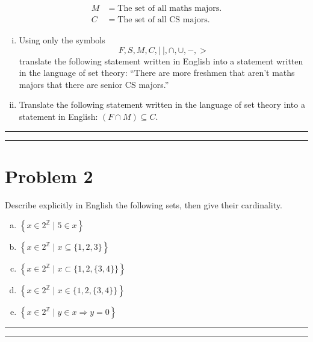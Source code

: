 \documentclass{article}
\theoremstyle{definition}
\newenvironment{solution}{\bigskip\hrule{\hfill}}{\bigskip\hrule{\hfill}} %
\begin{document}
\begin{enumerate}[a)]
\begin{align*}
        M & = \text{The set of all maths majors}. \\
        C & = \text{The set of all CS majors}. 
    \end{align*}
    \begin{enumerate}[i.] %
        \item Using only the symbols $$F,S,M,C,\left|~\right|,\cap,\cup,-,>$$ translate the following statement written in English into a statement written in the language of set theory: ``There are more freshmen that aren't maths majors that there are senior CS majors.''
        \item Translate the following statement written in the language of set theory into a statement in English: $\left(F\cap M\right)\subseteq C$.
    \end{enumerate}
\end{enumerate}
\begin{solution}


\end{solution}


\newpage


\section*{Problem 2}
Describe explicitly in English the following sets, then give their cardinality.
\begin{enumerate}[a)] %
    \item $\left\{x\in 2^{\mathbb{Z}}\mid 5\in x\right\}$
    \item $\left\{x\in 2^{\mathbb{Z}}\mid x\subseteq\{1,2,3\}\right\}$
    \item $\left\{x\in 2^{\mathbb{Z}}\mid x\subset\{1,2,\{3,4\}\}\right\}$
    \item $\left\{x\in 2^{\mathbb{Z}}\mid x\in\{1,2,\{3,4\}\}\right\}$
    \item $\left\{x\in 2^{\mathbb{Z}}\mid y\in x\Longrightarrow y=0\right\}$
\end{enumerate}
\begin{solution}


\end{solution}
\end{document}
